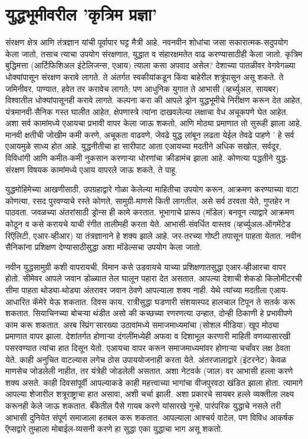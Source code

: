 \chapter{युद्धभूमीवरील 'कृत्रिम प्रज्ञा'}

संरक्षण क्षेत्र आणि तंत्रज्ञान यांची पूर्वापार घट्ट मैत्री आहे. नवनवीन शोधांचा जसा सकारात्मक-सदुपयोग केला जातो, तसाच त्याचा उपयोग संरक्षणात, युद्धात व संहारक्षमतेत वाढ करण्यासाठीही केला जातो. कृत्रिम बुद्धिमत्ता (आर्टिफिशिअल इंटेलिजन्स, एआय) त्याला कसा अपवाद असेल? देशाच्या पातळीवर वेगवेगळ्या धोक्यांपासून संरक्षण करावे लागते. ते अंतर्गत स्वकीयांकडून किंवा बाहेरील शत्रूंपासून असू शकते. ते जमिनीवर, पाण्यात, हवेत तर करावेच लागते; पण आधुनिक युगात ते आभासी (व्हर्च्युअल, सायबर) विश्वातील धोक्यांपासूनही करावे लागते. कल्पना करा की आपले ड्रोन युद्धभूमीचे निरीक्षण करून देत आहेत, यंत्रमानवी-सैनिक गस्त घालीत आहेत, क्षेपणास्त्रे त्यांना दाखवलेल्या लक्षाचा वेध अचूकपणे घेत आहेत. अशा सर्व कामांमध्ये एआयचा प्रभावी वापर केला जाऊ शकतो, आणि मोठ्या प्रमाणात तो सुरूही झाला आहे. मानवी क्षतीची जोखीम कमी करणे, अचूकता वाढवणे, जेवढे युद्ध लांबून लढता येईल तेवढे पाहणे ' हे सर्व एआयमुळे साध्य होत आहे. युद्धनीतीचा हा सारीपाट आता एआयच्या मदतीने अधिक सखोल, सर्वदूर, विविधांगी आणि कमीत-कमी नुकसान करणाऱ्या धोरणांचा क्रीडामंच झाला आहे. कोणत्या पद्धतीने युद्ध-संरक्षण विषयक कामांमध्ये एआय वापरले जाऊ शकते, ते पाहू.

युद्धमोहिमेच्या आखणीसाठी, उपग्रहाद्वारे गोळा केलेल्या माहितीचा उपयोग करून, आक्रमण करण्याच्या वाटा कोणत्या, रसद पुरवण्याचे रस्ते कोणते, सामुग्री-माणसे किती लागतील, असे सर्व ठरवता येते, गुप्तहेर न पाठवता. जवळच्या अंतरांसाठी ड्रोन्स ही कामे करतात. भूभागाचे प्रारूप (मॉडेल) बनवून त्याद्वारे आक्रमण कोठून व कसे करायचे याची रंगीत तालीमही करता येते. आभासी-संवर्धित वास्तव (व्हर्च्युअल-ऑगमेंटेड रिऍलिटी, एआर-व्हीआर) या तंत्रज्ञानाने हे शक्य झाले आहे. जर-तरच्या गोष्टी तपासून पाहता येतात. नवीन सैनिकांना प्रशिक्षण देण्यासाठीसुद्धा अशा मॉडेल्सचा उपयोग केला जातो.

नवीन युद्धसामुग्री कशी वापरायची, विमान कसे उडवायचे याच्या प्रशिक्षणातसुद्धा एआर-व्हीआरचा वापर होतो. सीमेवर आपले जवान डोळ्यात तेल घालून पहारा देत असतात. आपल्या देशाची शेकडो किलोमीटरची सीमा पाहता थोड्या-थोड्या अंतरावर जवान ठेवणे आपल्याला शक्य नाही. येथे त्यांच्या मदतीला एआय-आधारित कॅमेरे येऊ शकतात. दिवस काय, रात्रीसुद्धा घडणारी संशयास्पद हालचाल टिपून ते सतर्क करू शकतात. सियाचिनच्या बोचऱ्या थंडीत असो की कच्छच्या रणरणत्या उन्हात, दोन्ही ठिकाणी हे प्रभावीपणे काम करू शकतात. अरब स्प्रिंग'सारख्या उठावांमध्ये समाजमाध्यमांचा (सोशल मीडिया) खूप मोठ्या प्रमाणात वापर झाला. देशांतर्गत होणाऱ्या दंगलींमध्येही अफवा व दिशाभूल करणारी माहिती वणव्यासारखी पसरवण्यात त्यांचा हात दिसून येतो. एआयचा वापर करून समाजमाध्यमांवर होणाऱ्या चर्चांवर लक्ष ठेवता येते. काही अनुचित वाटल्यास लगेच ठोस उपाययोजनाही करता येते. अंतरजालाद्वारे (इंटरनेट) केवळ माणसेच जोडलेली नाहीत, तर यंत्रेही जोडलेली असतात. अशा नेटवर्क (जाल) वर आभासी हल्ला करणे शक्य असते. काही दिवसांपूर्वी आपल्याकडे काही महत्त्वाच्या भागांचा वीजपुरवठा खंडित झाला होता. त्यामागे आपल्या शेजारील शत्रूराष्ट्राचा हात असावा, अशी चर्चा झाली. अशा प्रकारचे सायबर हल्ले व्यक्तीला लक्ष्य करूनही केले जाऊ शकतात. बँकेतील पैसे गायब करणे यांसारखे गुन्हे, पारंपरिक युद्धाचे नसले तरी आभासी दुनियेत संपूर्ण समाजाला हतबल करू शकतात. आपल्याला आश्चर्य वाटेल, पण विविध आकर्षक ऍप्सद्वारे तुम्हाला मोबाईल-व्यसनी करणे हा सुद्धा एका युद्धाचा भाग असू शकतो.

